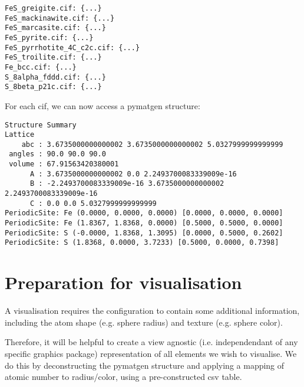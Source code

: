 \documentclass[10pt,parskip=half,
	toc=sectionentrywithdots,
	bibliography=totocnumbered,
	captions=tableheading,numbers=noendperiod]{scrartcl}
\begin{document}
\begin{lstlisting}[language={},postbreak={},numbers=none,xrightmargin=7pt,belowskip=5pt,aboveskip=5pt,breakindent=0pt]
FeS_greigite.cif: {...}
FeS_mackinawite.cif: {...}
FeS_marcasite.cif: {...}
FeS_pyrite.cif: {...}
FeS_pyrrhotite_4C_c2c.cif: {...}
FeS_troilite.cif: {...}
Fe_bcc.cif: {...}
S_8alpha_fddd.cif: {...}
S_8beta_p21c.cif: {...}

\end{lstlisting}

For each cif, we can now access a pymatgen structure:

\begin{lstlisting}[language={},postbreak={},numbers=none,xrightmargin=7pt,breakindent=0pt,aboveskip=5pt,belowskip=5pt]
Structure Summary
Lattice
    abc : 3.6735000000000002 3.6735000000000002 5.0327999999999999
 angles : 90.0 90.0 90.0
 volume : 67.91563420380001
      A : 3.6735000000000002 0.0 2.2493700083339009e-16
      B : -2.2493700083339009e-16 3.6735000000000002 2.2493700083339009e-16
      C : 0.0 0.0 5.0327999999999999
PeriodicSite: Fe (0.0000, 0.0000, 0.0000) [0.0000, 0.0000, 0.0000]
PeriodicSite: Fe (1.8367, 1.8368, 0.0000) [0.5000, 0.5000, 0.0000]
PeriodicSite: S (-0.0000, 1.8368, 1.3095) [0.0000, 0.5000, 0.2602]
PeriodicSite: S (1.8368, 0.0000, 3.7233) [0.5000, 0.0000, 0.7398]
\end{lstlisting}

\section{Preparation for
visualisation}\label{preparation-for-visualisation}

A visualisation requires the configuration to contain some additional
information, including the atom shape (e.g. sphere radius) and texture
(e.g. sphere color).

Therefore, it will be helpful to create a view agnostic (i.e.
independendant of any specific graphics package) representation of all
elements we wish to visualise. We do this by deconstructing the pymatgen
structure and applying a mapping of atomic number to radius/color, using
a pre-constructed csv table.
\end{document}
